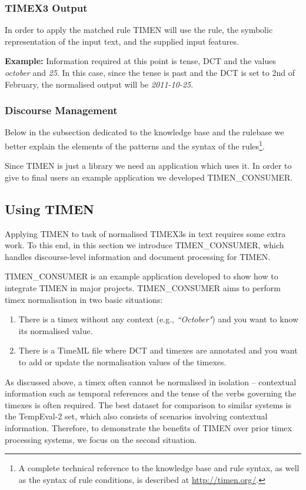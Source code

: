 \documentclass[10pt, a4paper]{article}
\begin{document}
\subsubsection{TIMEX3 Output}
In order to apply the matched rule TIMEN will use the rule, the symbolic representation of the input text, and the supplied input features.

\textbf{Example:}
Information required at this point is tense, DCT and the values \textit{october} and \textit{25}. In this case, since the tense is past and the DCT is set to 2nd of February, the normalised output will be \textit{2011-10-25}.

\subsubsection{Discourse Management}
Below in the subsection dedicated to the knowledge base and the rulebase we better explain the elements of the patterns and the syntax of the rules\footnote{\scriptsize A complete technical reference to the knowledge base and rule syntax, as well as the syntax of rule conditions, is described at \url{http://timen.org/}.}.

Since TIMEN is just a library we need an application which uses it. In order to give to final users an example application we developed TIMEN\_CONSUMER.

\subsection{Using TIMEN}

Applying TIMEN to task of normalised TIMEX3s in text requires some extra work. To this end, in this section we introduce TIMEN\_CONSUMER, which handles discourse-level information and document processing for TIMEN.

TIMEN\_CONSUMER is an example application developed to show how to integrate TIMEN in major projects.
TIMEN\_CONSUMER aims to perform timex normalisation in two basic situations:

\begin{enumerate}
\item There is a timex without any context (e.g., \emph{``October"}) and you want to know its normalised value.
\item There is a TimeML file where DCT and timexes are annotated and you want to add or update the normalisation values of the timexes.
\end{enumerate}

As discussed above, a timex often cannot be normalised in isolation -- contextual information such as temporal references and the tense of the verbs governing the timexes is often required. The best dataset for comparison to similar systems is the TempEval-2 set, which also consists of scenarios involving contextual information. Therefore, to demonstrate the benefits of TIMEN over prior timex processing systems, we focus on the second situation.
\end{document}
